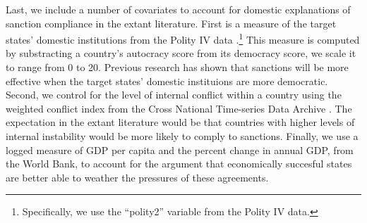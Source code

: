 

Last, we include a number of covariates to account for domestic explanations of sanction compliance in the extant literature. First is a measure of the target states' domestic institutions from the Polity IV data \citep{marshall2002polity}.\footnote{Specifically, we use the ``polity2'' variable from the Polity IV data.} This measure is computed by substracting a country's autocracy score from its democracy score, we scale it to range from 0 to 20. Previous research has shown that sanctions will be more effective when the target states' domestic instituions are more democratic. Second, we control for the level of internal conflict within  a country using the weighted conflict index from the Cross National Time-series Data Archive \citep{banks2011cross}. The expectation in the extant literature would be that countries with higher levels of internal instability would be more likely to comply to sanctions. Finally, we use a logged measure of GDP per capita and the percent change in annual GDP, from the World Bank, to account for the argument that economically succesful states are better able to weather the pressures of these agreements.